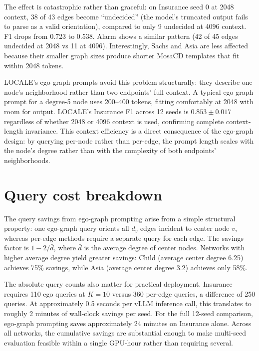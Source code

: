 \documentclass{article}
\begin{document}
The effect is catastrophic rather than graceful: on Insurance seed 0 at 2048 context, 38 of 43 edges become ``undecided'' (the model's truncated output fails to parse as a valid orientation), compared to only 9 undecided at 4096 context. F1 drops from 0.723 to 0.538. Alarm shows a similar pattern (42 of 45 edges undecided at 2048 vs 11 at 4096). Interestingly, Sachs and Asia are less affected because their smaller graph sizes produce shorter MosaCD templates that fit within 2048 tokens.

LOCALE's ego-graph prompts avoid this problem structurally: they describe one node's neighborhood rather than two endpoints' full context. A typical ego-graph prompt for a degree-5 node uses 200--400 tokens, fitting comfortably at 2048 with room for output. LOCALE's Insurance F1 across 12 seeds is $0.853 \pm 0.017$ regardless of whether 2048 or 4096 context is used, confirming complete context-length invariance. This context efficiency is a direct consequence of the ego-graph design: by querying per-node rather than per-edge, the prompt length scales with the node's degree rather than with the complexity of both endpoints' neighborhoods.

\section{Query cost breakdown}
\label{app:queries}

The query savings from ego-graph prompting arise from a simple structural property: one ego-graph query orients all $d_v$ edges incident to center node $v$, whereas per-edge methods require a separate query for each edge. The savings factor is $1 - 2/\bar{d}$, where $\bar{d}$ is the average degree of center nodes. Networks with higher average degree yield greater savings: Child (average center degree 6.25) achieves 75\% savings, while Asia (average center degree 3.2) achieves only 58\%.

The absolute query counts also matter for practical deployment. Insurance requires 110 ego queries at $K{=}10$ versus 360 per-edge queries, a difference of 250 queries. At approximately 0.5 seconds per vLLM inference call, this translates to roughly 2 minutes of wall-clock savings per seed. For the full 12-seed comparison, ego-graph prompting saves approximately 24 minutes on Insurance alone. Across all networks, the cumulative savings are substantial enough to make multi-seed evaluation feasible within a single GPU-hour rather than requiring several.
\end{document}
